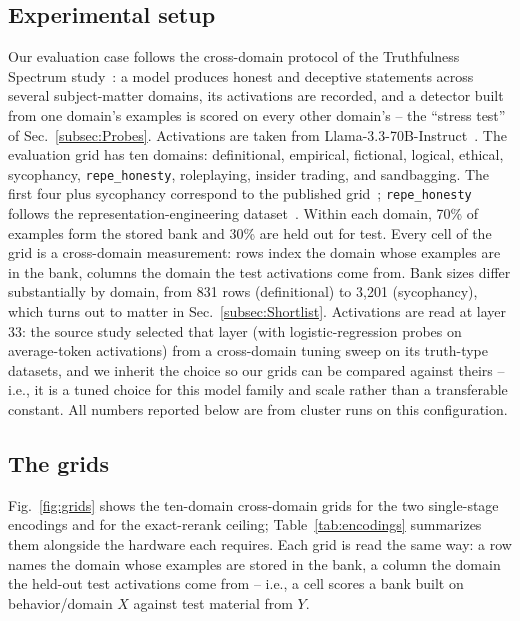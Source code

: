 \documentclass[conference]{IEEEtran}
\begin{document}
\subsection{Experimental setup}
\label{subsec:Setup}
Our evaluation case follows the cross-domain protocol of the
Truthfulness Spectrum study~\cite{ying2026spectrum}: a model produces
honest and deceptive statements across several subject-matter
domains, its activations are recorded, and a detector built from one
domain's examples is scored on every other domain's -- the ``stress
test'' of Sec.~\ref{subsec:Probes}. Activations are taken from
Llama-3.3-70B-Instruct~\cite{llama3herd}. The evaluation grid has ten
domains:
definitional, empirical, fictional, logical, ethical, sycophancy,
\texttt{repe\_honesty}, roleplaying, insider trading, and sandbagging. The
first four plus sycophancy correspond to the published
grid~\cite{ying2026spectrum}; \texttt{repe\_honesty} follows the
representation-engineering dataset~\cite{zou2023repe}. Within each
domain, 70\% of examples form the stored bank and 30\% are held out for
test. Every cell of the grid is a cross-domain measurement: rows index
the domain whose examples are in the bank, columns the domain the test
activations come from. Bank sizes differ substantially by domain, from
831 rows (definitional) to 3{,}201 (sycophancy), which turns out to
matter in Sec.~\ref{subsec:Shortlist}. Activations are read at layer
33: the source study selected that layer (with logistic-regression
probes on average-token activations) from a cross-domain tuning sweep
on its truth-type datasets, and we inherit the choice so our grids
can be compared against theirs -- i.e., it is a tuned choice for this
model family and scale rather than a transferable constant. All
numbers reported below are from cluster runs on this
configuration.

\subsection{The grids}
\label{subsec:Grids}

Fig.~\ref{fig:grids} shows the ten-domain cross-domain grids
for the two single-stage encodings and for the exact-rerank ceiling;
Table~\ref{tab:encodings} summarizes them alongside the hardware each
requires. Each grid is read the same way: a row names the domain
whose examples are stored in the bank, a column the domain the
held-out test activations come from -- i.e., a cell scores a bank
built on behavior/domain $X$ against test material from
$Y$.
\end{document}

